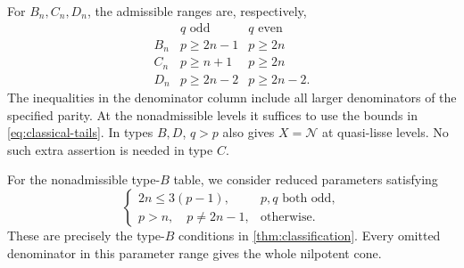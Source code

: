 \documentclass[11pt,a4paper]{amsart}
\numberwithin{equation}{section}
\theoremstyle{definition}
\theoremstyle{remark}
\newcommand{\N}{\mathcal N}
\begin{document}
For $B_n,C_n,D_n$, the admissible ranges are, respectively,
$$
\begin{array}{c|cc}
 &q\text{ odd}&q\text{ even}\\\hline
B_n&p\ge2n-1&p\ge2n\\
C_n&p\ge n+1&p\ge2n\\
D_n&p\ge2n-2&p\ge2n-2.
\end{array}
$$
The inequalities in the denominator column include all larger denominators
of the specified parity. At the nonadmissible levels it suffices to use
the bounds in \eqref{eq:classical-tails}. In types $B,D$, $q>p$ also
gives $X=\N$ at quasi-lisse levels. No such extra assertion is needed
in type $C$.

For the nonadmissible type-$B$ table, we consider reduced parameters
satisfying
$$
 \begin{cases}
  2n\le3(p-1),&p,q\text{ both odd},\\
  p>n,\quad p\ne2n-1,&\text{otherwise}.
 \end{cases}
$$
These are precisely the type-$B$ conditions in
\cref{thm:classification}. Every omitted denominator in this parameter
range gives the whole nilpotent cone. 
\end{document}
